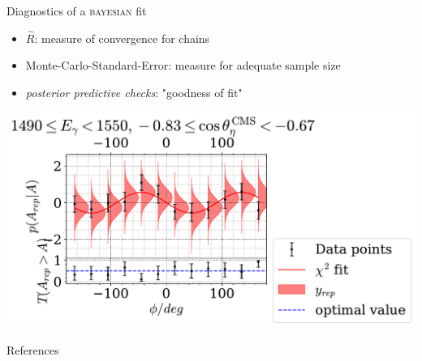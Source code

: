 \documentclass[11pt,aspectratio=169,dvipsnames]{beamer}
\begin{document}
\begin{frame}{Diagnostics of a \textsc{bayesian} fit}
\begin{itemize}
	\item $\hat{R}$: measure of convergence for chains
	\item Monte-Carlo-Standard-Error: measure for adequate sample size
	\item \emph{posterior predictive checks}: "goodness of fit"\\

\end{itemize}
\centering
	\includegraphics[width=.85\linewidth]{../bayes/realdeal/ppd_checks_alt/ebin6costbin1.pdf}
\end{frame}
\begin{frame}[allowframebreaks]{References}
	\printbibliography
	
\end{frame}
\end{document}
